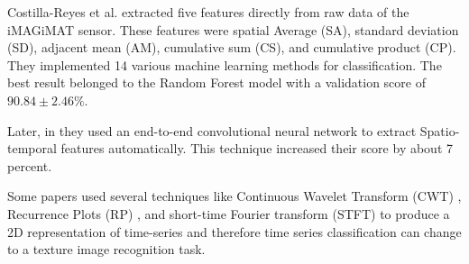 Costilla-Reyes et al. \cite{Costilla-Reyes2016TemporalSystem} extracted five features directly from raw data of the iMAGiMAT sensor. These features were spatial Average (SA), standard deviation (SD), adjacent mean (AM), cumulative sum (CS), and cumulative product (CP).
They implemented 14 various machine learning methods for classification. The best result belonged to the Random Forest model with a validation score of $90.84 \pm 2.46\%$. 

Later, in \cite{Costilla-Reyes2018DeepSensors} they used an end-to-end convolutional neural network to extract Spatio-temporal features automatically. This technique increased their score by about 7 percent.


 Some papers used several techniques like Continuous Wavelet Transform (CWT) \cite{Wang2021AutomaticNetwork}, Recurrence Plots (RP) \cite{Hatami2017ClassificationNetworks}, and short-time Fourier transform (STFT) \cite{Huang2019ECGNetwork} to produce a 2D representation of time-series and therefore time series classification can change to a texture image recognition task. 


